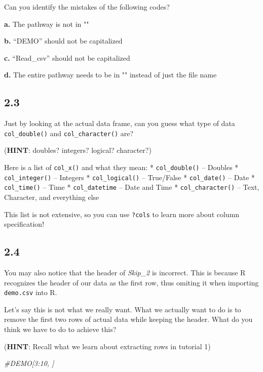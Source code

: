 \documentclass[
]{book}
\newenvironment{Shaded}{\begin{snugshade}}{\end{snugshade}}
\newcommand{\CommentTok}[1]{\textcolor[rgb]{0.56,0.35,0.01}{\textit{#1}}}
\begin{document}
Can you identify the mistakes of the following codes?

\textbf{a.} The pathway is not in ""

\textbf{b.} ``DEMO'' should not be capitalized

\textbf{c.} ``Read\_csv'' should not be capitalized

\textbf{d.} The entire pathway needs to be in "" instead of just the file name

\hypertarget{section-11}{%
\subsection{2.3}\label{section-11}}

Just by looking at the actual data frame, can you guess what type of data \texttt{col\_double()} and \texttt{col\_character()} are?

(\textbf{HINT}: doubles? integers? logical? character?)

Here is a list of \texttt{col\_x()} and what they mean:
* \texttt{col\_double()} -- Doubles
* \texttt{col\_integer()} -- Integers
* \texttt{col\_logical()} -- True/False
* \texttt{col\_date()} -- Date
* \texttt{col\_time()} -- Time
* \texttt{col\_datetime} -- Date and Time
* \texttt{col\_character()} -- Text, Character, and everything else

This list is not extensive, so you can use \texttt{?cols} to learn more about column specification!

\hypertarget{section-12}{%
\subsection{2.4}\label{section-12}}

You may also notice that the header of \emph{Skip\_2} is incorrect. This is because R recognizes the header of our data as the first row, thus omiting it when importing \texttt{demo.csv} into R.

Let's say this is not what we really want. What we actually want to do is to remove the first two rows of actual data while keeping the header. What do you think we have to do to achieve this?

(\textbf{HINT}: Recall what we learn about extracting rows in tutorial 1)

\begin{Shaded}
\begin{Highlighting}[]
\CommentTok{\#DEMO[3:10, ]}
\end{Highlighting}
\end{Shaded}
\end{document}
